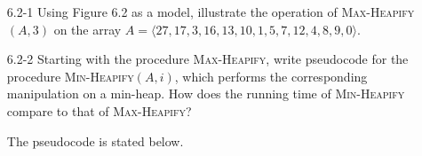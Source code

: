 \documentclass{report}
\makeatletter
\renewenvironment{framed}{%
 \def\FrameCommand##1{\hskip\@totalleftmargin
 \fboxsep=\FrameSep\fbox{##1}}%
 \MakeFramed {\advance\hsize-\width
   \@totalleftmargin\z@ \linewidth\hsize
   \@setminipage}}%
 {\par\unskip\endMakeFramed}
\makeatother
\begin{document}
\begin{enumerate}

\item[6.2-1]{Using Figure 6.2 as a model, illustrate the operation of
\textsc{Max-Heapify}$(A, 3)$ on the array
$A = \langle 27, 17, 3, 16, 13, 10, 1, 5, 7, 12, 4, 8, 9, 0 \rangle$.}

\begin{framed}
\begin{center}
\end{center}
\end{framed}

\item[6.2-2]{Starting with the procedure \textsc{Max-Heapify}, write pseudocode
for the procedure \textsc{Min-Heapify}$(A, i)$, which performs the corresponding
manipulation on a min-heap. How does the running time of \textsc{Min-Heapify}
compare to that of \textsc{Max-Heapify}?}

\begin{framed}
The pseudocode is stated below.


\end{framed}
\end{enumerate}
\end{document}
